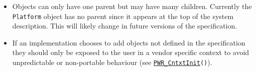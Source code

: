 \documentclass[12pt]{report} %
\def\PWR#1{\texttt{PWR\_{#1}}}%
\newcommand\funcref[1]{\hyperref[func:#1]{\PWR{#1}}\texttt{()}\marginnote{\scriptsize{p.~\pageref{func:#1}}}} %
\providecommand{\DIFdeltex}[1]{{\protect\color{red}\sout{#1}}}                      %
\providecommand{\DIFaddbegin}{} %
\providecommand{\DIFdelend}{} %
\providecommand{\DIFdel}[1]{\texorpdfstring{\DIFdeltex{#1}}{}} %
\newcommand{\DIFaddincludegraphics}[2][]{{\color{blue}\fbox{\DIFOincludegraphics[#1]{#2}}}} %
\DeclareRobustCommand{\DIFaddbegin}{\DIFOaddbegin \let\includegraphics\DIFaddincludegraphics} %
\DeclareRobustCommand{\DIFdelend}{\DIFOaddend \let\includegraphics\DIFOincludegraphics} %
\begin{document}
\begin{itemize}[noitemsep,nolistsep]

\DIFdel{).
}\DIFdelend \DIFaddbegin \item{
	Objects can only have one parent but may have many children. Currently the \texttt{Platform} object has no parent since it appears at the top of the system description. This will likely change in future versions of the specification.
	}
        \item{
        If an implementation chooses to add objects not defined in the specification they should only be exposed to the user in a vendor specific context to avoid unpredictable or non-portable behaviour (see \funcref{CntxtInit}).
        }
\end{itemize}

\end{document}
